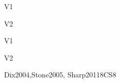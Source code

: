 \begin{syllabus}
\begin{outcomes}{V1}
    \item {}
    \item {}
    \item {}
    \item {}
\end{outcomes}

\begin{outcomes}{V2}
    \item {}
    \item {}
    \item {}
    \item {}
\end{outcomes}

\begin{competences}{V1}
    \item {} 
    \item {}
    \item {}
    \item {}
    \item {}
\end{competences}

\begin{competences}{V2}
    \item {} 
    \item {}
    \item {}
    \item {}
    \item {}
\end{competences}

\begin{unit}{\HCIFoundations}{}{Dix2004,Stone2005, Sharp2011}{8}{CS8}
\begin{topics}
    \item \HCIFoundationsTopicContexts
    \item \HCIFoundationsTopicUsability
    \item \HCIFoundationsTopicProcesses
    \item \HCIFoundationsTopicPrinciples
    \item \HCIFoundationsTopicDifferent
\end{topics}
\begin{learningoutcomes}
    \item \HCIFoundationsLODiscussWhy [\Familiarity]
    \item \HCIFoundationsLODefineA [\Familiarity]
    \item \HCIFoundationsLOSummarizeTheOf [\Familiarity]
      \item \HCIFoundationsLODevelop	[\Familiarity]
\end{learningoutcomes}
\end{unit}


\end{syllabus}
